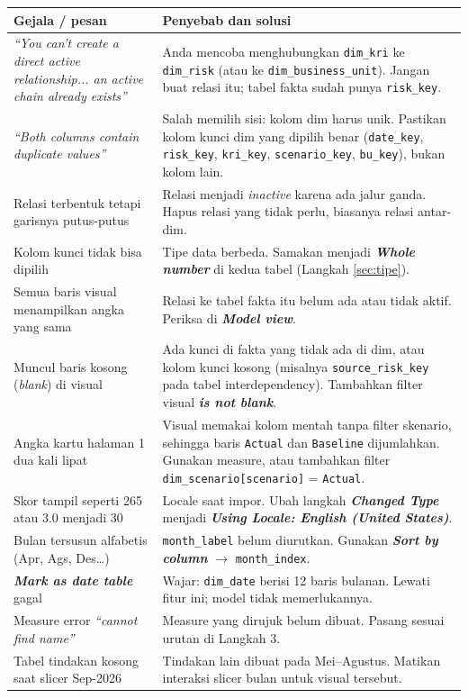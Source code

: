 \documentclass[11pt,a4paper]{article}
\newcommand{\file}[1]{\texttt{\small #1}}
\newcommand{\ui}[1]{\textbf{\textit{#1}}}
\begin{document}
\begin{longtable}{>{\raggedright\arraybackslash}p{5.9cm}>{\raggedright\arraybackslash}p{8.9cm}}
\toprule
\textbf{Gejala / pesan} & \textbf{Penyebab dan solusi} \\
\midrule
\endhead
\emph{``You can't create a direct active relationship... an active chain already exists''} & Anda mencoba menghubungkan \file{dim\_kri} ke \file{dim\_risk} (atau ke \file{dim\_business\_unit}). Jangan buat relasi itu; tabel fakta sudah punya \file{risk\_key}. \\
\emph{``Both columns contain duplicate values''} & Salah memilih sisi: kolom dim harus unik. Pastikan kolom kunci dim yang dipilih benar (\file{date\_key}, \file{risk\_key}, \file{kri\_key}, \file{scenario\_key}, \file{bu\_key}), bukan kolom lain. \\
Relasi terbentuk tetapi garisnya putus-putus & Relasi menjadi \emph{inactive} karena ada jalur ganda. Hapus relasi yang tidak perlu, biasanya relasi antar-dim. \\
Kolom kunci tidak bisa dipilih & Tipe data berbeda. Samakan menjadi \ui{Whole number} di kedua tabel (Langkah \ref{sec:tipe}). \\
Semua baris visual menampilkan angka yang sama & Relasi ke tabel fakta itu belum ada atau tidak aktif. Periksa di \ui{Model view}. \\
Muncul baris kosong (\emph{blank}) di visual & Ada kunci di fakta yang tidak ada di dim, atau kolom kunci kosong (misalnya \file{source\_risk\_key} pada tabel interdependency). Tambahkan filter visual \ui{is not blank}. \\
Angka kartu halaman 1 dua kali lipat & Visual memakai kolom mentah tanpa filter skenario, sehingga baris \texttt{Actual} dan \texttt{Baseline} dijumlahkan. Gunakan measure, atau tambahkan filter \file{dim\_scenario[scenario]} = \texttt{Actual}. \\
Skor tampil seperti 265 atau 3.0 menjadi 30 & Locale saat impor. Ubah langkah \ui{Changed Type} menjadi \ui{Using Locale: English (United States)}. \\
Bulan tersusun alfabetis (Apr, Ags, Des\ldots) & \file{month\_label} belum diurutkan. Gunakan \ui{Sort by column} $\rightarrow$ \file{month\_index}. \\
\ui{Mark as date table} gagal & Wajar: \file{dim\_date} berisi 12 baris bulanan. Lewati fitur ini; model tidak memerlukannya. \\
Measure error \emph{``cannot find name''} & Measure yang dirujuk belum dibuat. Pasang sesuai urutan di Langkah 3. \\
Tabel tindakan kosong saat slicer Sep-2026 & Tindakan lain dibuat pada Mei--Agustus. Matikan interaksi slicer bulan untuk visual tersebut. \\
\bottomrule
\end{longtable}
\end{document}
